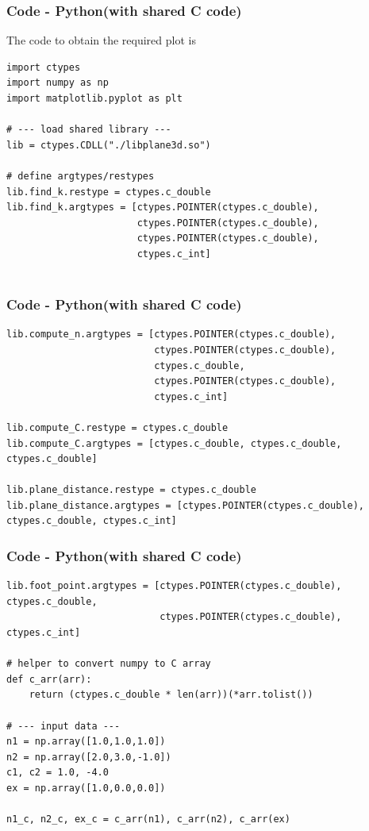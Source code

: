 \documentclass{beamer}
\theoremstyle{remark}
\numberwithin{equation}{section}
\begin{document}
\begin{frame}[fragile]
    \frametitle{Code - Python(with shared C code)}
    The code to obtain the required plot is
    \begin{lstlisting}
import ctypes
import numpy as np
import matplotlib.pyplot as plt

# --- load shared library ---
lib = ctypes.CDLL("./libplane3d.so")

# define argtypes/restypes
lib.find_k.restype = ctypes.c_double
lib.find_k.argtypes = [ctypes.POINTER(ctypes.c_double),
                       ctypes.POINTER(ctypes.c_double),
                       ctypes.POINTER(ctypes.c_double),
                       ctypes.c_int]


\end{lstlisting}
\end{frame}
\begin{frame}[fragile]
\frametitle{Code - Python(with shared C code)}
\begin{lstlisting}
lib.compute_n.argtypes = [ctypes.POINTER(ctypes.c_double),
                          ctypes.POINTER(ctypes.c_double),
                          ctypes.c_double,
                          ctypes.POINTER(ctypes.c_double),
                          ctypes.c_int]

lib.compute_C.restype = ctypes.c_double
lib.compute_C.argtypes = [ctypes.c_double, ctypes.c_double, ctypes.c_double]

lib.plane_distance.restype = ctypes.c_double
lib.plane_distance.argtypes = [ctypes.POINTER(ctypes.c_double), ctypes.c_double, ctypes.c_int]

\end{lstlisting}
\end{frame}

\begin{frame}[fragile]
\frametitle{Code - Python(with shared C code)}
\begin{lstlisting}
lib.foot_point.argtypes = [ctypes.POINTER(ctypes.c_double), ctypes.c_double,
                           ctypes.POINTER(ctypes.c_double), ctypes.c_int]

# helper to convert numpy to C array
def c_arr(arr):
    return (ctypes.c_double * len(arr))(*arr.tolist())

# --- input data ---
n1 = np.array([1.0,1.0,1.0])
n2 = np.array([2.0,3.0,-1.0])
c1, c2 = 1.0, -4.0
ex = np.array([1.0,0.0,0.0])

n1_c, n2_c, ex_c = c_arr(n1), c_arr(n2), c_arr(ex)

\end{lstlisting}
\end{frame}
\end{document}
